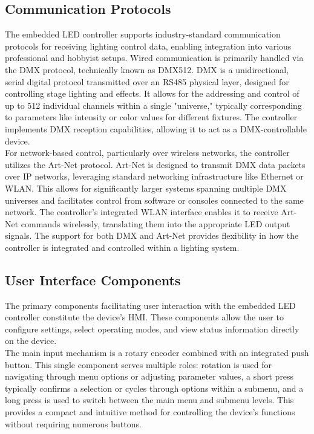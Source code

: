\subsection{Communication Protocols}
The embedded \ac{LED} controller supports industry-standard communication protocols for receiving lighting control data, enabling integration into various professional and hobbyist setups. Wired communication is primarily handled via the \ac{DMX} protocol, technically known as DMX512. \ac{DMX} is a unidirectional, serial digital protocol transmitted over an \ac{RS485} physical layer, designed for controlling stage lighting and effects. It allows for the addressing and control of up to 512 individual channels within a single "universe," typically corresponding to parameters like intensity or color values for different fixtures. The controller implements \ac{DMX} reception capabilities, allowing it to act as a DMX-controllable device.\\

For network-based control, particularly over wireless networks, the controller utilizes the Art-Net protocol. Art-Net is designed to transmit \ac{DMX} data packets over \ac{IP} networks, leveraging standard networking infrastructure like Ethernet or \ac{WLAN}. This allows for significantly larger systems spanning multiple \ac{DMX} universes and facilitates control from software or consoles connected to the same network. The controller's integrated \ac{WLAN} interface enables it to receive Art-Net commands wirelessly, translating them into the appropriate \ac{LED} output signals. The support for both \ac{DMX} and Art-Net provides flexibility in how the controller is integrated and controlled within a lighting system.

\subsection{User Interface Components}
The primary components facilitating user interaction with the embedded \ac{LED} controller constitute the device's \ac{HMI}. These components allow the user to configure settings, select operating modes, and view status information directly on the device.\\

The main input mechanism is a rotary encoder combined with an integrated push button. This single component serves multiple roles: rotation is used for navigating through menu options or adjusting parameter values, a short press typically confirms a selection or cycles through options within a submenu, and a long press is used to switch between the main menu and submenu levels. This provides a compact and intuitive method for controlling the device's functions without requiring numerous buttons. \\


